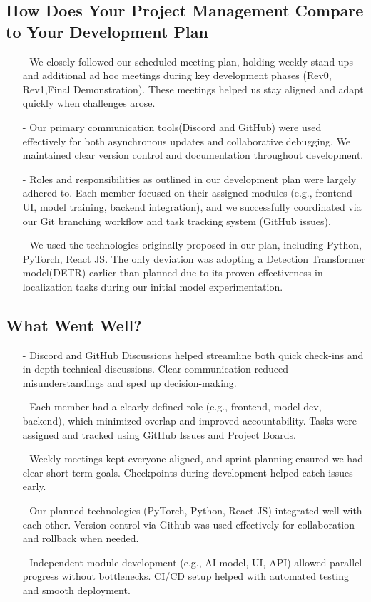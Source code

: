 \documentclass{article}
\begin{document}
\subsection{How Does Your Project Management Compare to Your Development Plan}
\begin{enumerate}
    \item[-] We closely followed our scheduled meeting plan, holding weekly stand-ups and additional ad hoc meetings during key development phases (Rev0, Rev1,Final Demonstration). These meetings helped us stay aligned and adapt quickly when challenges arose. 
    \item[-] Our primary communication tools(Discord and GitHub) were used effectively for both asynchronous updates and collaborative debugging. We maintained clear version control and documentation throughout development. 
    \item[-] Roles and responsibilities as outlined in our development plan were largely adhered to. Each member focused on their assigned modules (e.g., frontend UI, model training, backend integration), and we successfully coordinated via our Git branching workflow and task tracking system (GitHub issues).
    \item[-] We used the technologies originally proposed in our plan, including Python, PyTorch, React JS. The only deviation was adopting a Detection Transformer model(DETR) earlier than planned due to its proven effectiveness in localization tasks during our initial model experimentation. 
\end{enumerate}

\subsection{What Went Well?}
\begin{enumerate}
    \item[-] Discord and GitHub Discussions helped streamline both quick check-ins and in-depth technical discussions. Clear communication reduced misunderstandings and sped up decision-making.
    \item[-] Each member had a clearly defined role (e.g., frontend, model dev, backend), which minimized overlap and improved accountability. Tasks were assigned and tracked using GitHub Issues and Project Boards.
    \item[-] Weekly meetings kept everyone aligned, and sprint planning ensured we had clear short-term goals. Checkpoints during development helped catch issues early.
    \item[-] Our planned technologies (PyTorch, Python, React JS) integrated well with each other. Version control via Github was used effectively for collaboration and rollback when needed.
    \item[-] Independent module development (e.g., AI model, UI, API) allowed parallel progress without bottlenecks. CI/CD setup helped with automated testing and smooth deployment.
    
\end{enumerate}
\end{document}
